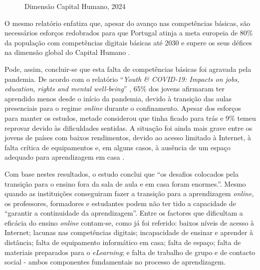 \begin{figure}[hbtp]
	\centering%
		\centering
		\qquad
		\caption{Dimensão Capital Humano, 2024 \cite{itu2024facts}}%
		\label{fig:capitalhumano}%
	\end{figure}

O mesmo relatório enfatiza que, apesar do avanço nas competências básicas, são necessários esforços redobrados para que Portugal atinja a meta europeia de 80\% da população com competências digitais básicas até 2030 e supere os seus défices na dimensão global do Capital Humano \cite{DESI2024}.

Pode, assim, concluir-se que esta falta de competências básicas foi agravada pela pandemia. De acordo com o relatório ``\textit{Youth \& COVID-19: Impacts on jobs, education, rights and mental well-being}'' \cite{impactocovideducacao}, 65\% dos jovens afirmaram ter aprendido menos desde o início da pandemia, devido à transição das aulas presenciais para o regime \textit{online} durante o confinamento. Apesar dos esforços para manter os estudos, metade considerou que tinha ficado para trás e 9\% temeu reprovar devido às dificuldades sentidas. A situação foi ainda mais grave entre os jovens de países com baixos rendimentos, devido ao acesso limitado à Internet, à falta crítica de equipamentos e, em alguns casos, à ausência de um espaço adequado para aprendizagem em casa \cite{impactocovideducacao}.

Com base nestes resultados, o estudo conclui que ``os desafios colocados pela transição para o ensino fora da sala de aula e em casa foram enormes.''. Mesmo quando as instituições conseguiram fazer a transição para a aprendizagem \textit{online}, os professores, formadores e estudantes podem não ter tido a capacidade de ``garantir a continuidade da aprendizagem''. Entre os factores que dificultam a eficácia do ensino \textit{online} contam-se, como já foi referido: baixos níveis de acesso à Internet; lacunas nas competências digitais; incapacidade de ensinar e aprender à distância; falta de equipamento informático em casa; falta de espaço; falta de materiais preparados para o \textit{eLearning}; e falta de trabalho de grupo e de contacto social - ambos componentes fundamentais no processo de aprendizagem.

